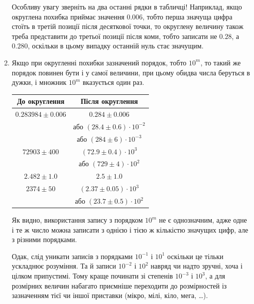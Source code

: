 \documentclass{LabBook}
\begin{document}
\begin{enumerate}
          \begin{Warning}
            Особливу увагу зверніть на два останні рядки в табличці! Наприклад, якщо округлена похибка приймає значення $0.006$, тобто перша значуща цифра стоїть в третій позиції після десяткової точки, то округлену величину також треба представити до третьої позиції після коми, тобто записати не $0.28$, а $0.280$, оскільки в цьому випадку останній нуль стає значущим.
          \end{Warning}
    \item Якщо при округленні похибки зазначений порядок, тобто $10^m$, то такий же порядок повинен бути і у самої величини, при цьому обидва числа беруться в дужки, і множник $10^m$ вказується один раз.
          \begin{center}
            \begin{tabular}{cc}
              \toprule
              До округлення      & Після округлення                  \\ \midrule
              $0.283984\pm0.006$ & $0.284\pm 0.006$                  \\
                                 & або $(28.4 \pm 0.6)\cdot 10^{-2}$ \\
                                 & або $(284 \pm 6)\cdot 10^{-3}$    \\\midrule
              $72903\pm400$      & $(72.9\pm0.4) \cdot 10^3$         \\
                                 & або $(729 \pm 4)\cdot 10^2$       \\\midrule
              $2.482\pm1.0$      & $2.5\pm1.0$                       \\\midrule
              $2374\pm50$        & $(2.37\pm0.05)\cdot 10^3$         \\
                                 & або $(23.7\pm0.5)\cdot 10^2$      \\ \bottomrule
            \end{tabular}
          \end{center}

          Як видно, використання запису з порядком $10^m$ не є однозначним, адже одне і те ж число можна записати з однією і тією ж кількістю значущих цифр, але з різними порядками.

          Одак, слід уникати записів з порядками $10^{-1}$ і $10^1$ оскільки це тільки ускладнює розуміння. Та й записи $10^{-2}$ і $10^2$ навряд чи надто зручні, хоча і цілком припустимі. Тому краще починати зі степенів $10^{-3}$ і $10^3$, а для розмірних величин набагато приємніше переходити до розмірностей із зазначенням тієї чи іншої приставки (мікро, мілі, кіло, мега, \ldots).
  \end{enumerate}
\end{document}
